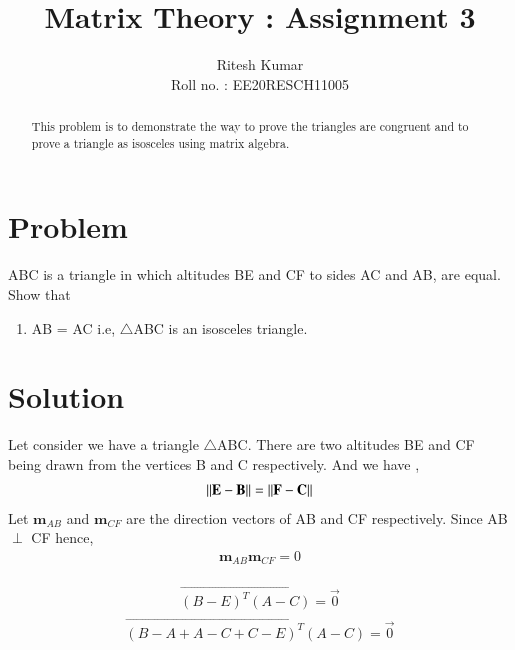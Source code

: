 \documentclass[journal,12pt,twocolumn]{IEEEtran}
\begin{document}
     \def\rightbox#1{\makebox[0in][r]{#1}}
     \def\centbox#1{\makebox[0in]{#1}}
     \def\topbox#1{\raisebox{-\baselineskip}[0in][0in]{#1}}
     \def\midbox#1{\raisebox{-0.5\baselineskip}[0in][0in]{#1}}
\vspace{3cm}
\title{ Matrix Theory : Assignment 3 }
\author{Ritesh Kumar \\ Roll no. : EE20RESCH11005 }
\maketitle
\newpage
\bigskip
\renewcommand{\thefigure}{\theenumi}
\renewcommand{\thetable}{\theenumi}
\begin{abstract}
This problem is to demonstrate the way to prove the triangles are congruent and to prove a triangle as isosceles using matrix algebra.
\end{abstract}

\section{Problem}
ABC is a triangle in which altitudes BE and CF to sides AC and AB, are equal. Show that 
\begin{enumerate}
	\item AB = AC  i.e, $\triangle$ABC is an isosceles triangle.
\end{enumerate}
\section{Solution}
Let consider we have a triangle $\triangle$ABC. There are two altitudes BE and CF being  drawn from the vertices B and C respectively. And we have ,
 \begin{align}
 	\left\lVert\mathbf{E - B}\right\rVert = \left\lVert\mathbf{F - C}\right\rVert \label{eq2.1}
 \end{align}
Let $\textbf{m}_{AB}$ and $\textbf{m}_{CF}$ are the direction vectors of AB and CF respectively. Since AB $\perp$ CF hence,
\begin{align}
 \textbf{m}_{AB} \textbf{m}_{CF} = 0
\end{align}

\begin{align}
 \vec{\left( B - E\right)^T \left(A - C \right)} =\vec{ 0}
\end{align}
\begin{align}
\vec{\left( B -  A + A - C + C - E\right)^T \left(A - C \right)} = \vec{0}
\end{align}
\end{document}
